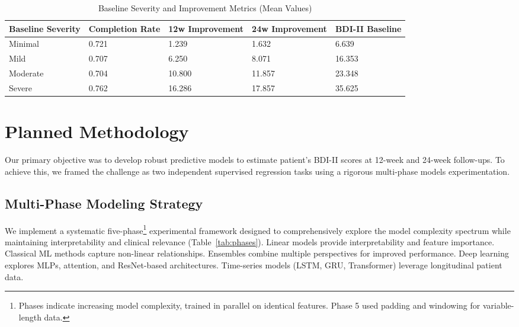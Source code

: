 \documentclass[conference]{IEEEtran}
\begin{document}
\begin{table}
\centering
\caption{Baseline Severity and Improvement Metrics (Mean Values)}
\label{tab:severity_metrics_mean}
\begin{tabularx}{\linewidth}{|X|X|X|X|X|}
\hline
\textbf{Baseline Severity} & \textbf{Completion Rate} & \textbf{12w Improvement} & \textbf{24w Improvement} & \textbf{BDI-II Baseline} \\
\hline
Minimal & 0.721 & 1.239 & 1.632 & 6.639 \\ 
Mild & 0.707 & 6.250 & 8.071 & 16.353 \\ 
Moderate & 0.704 & 10.800 & 11.857 & 23.348 \\ 
Severe& 0.762 & 16.286 & 17.857 & 35.625 \\
\hline
\end{tabularx}
\end{table}




\section{Planned Methodology}

Our primary objective was to develop robust predictive models to estimate patient's BDI-II scores at 12-week and 24-week follow-ups. To achieve this, we framed the challenge as two independent supervised regression tasks using a rigorous multi-phase models experimentation.
\subsection{Multi-Phase Modeling Strategy}
We implement a systematic five-phase\footnote{Phases indicate increasing model complexity, trained in parallel on identical features. Phase 5 used padding and windowing for variable-length data.} experimental framework designed to comprehensively explore the model complexity spectrum while maintaining interpretability and clinical relevance (Table~\ref{tab:phases}). Linear models provide interpretability and feature importance. Classical ML methods capture non-linear relationships. Ensembles combine multiple perspectives for improved performance. Deep learning explores MLPs, attention, and ResNet-based architectures. Time-series models (LSTM, GRU, Transformer) leverage longitudinal patient data.
\end{document}
